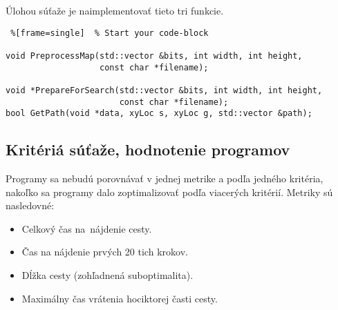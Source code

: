 Úlohou súťaže je naimplementovať tieto tri funkcie.

\lstset{language=C++}          %

\begin{lstlisting} %[frame=single]  % Start your code-block

void PreprocessMap(std::vector &bits, int width, int height,
                   const char *filename);
                   
void *PrepareForSearch(std::vector &bits, int width, int height,
                       const char *filename);
bool GetPath(void *data, xyLoc s, xyLoc g, std::vector &path);
\end{lstlisting}

\subsection{Kritériá súťaže, hodnotenie programov}
Programy sa nebudú porovnávať v jednej metrike a podľa jedného
kritéria, nakoľko sa programy dalo zoptimalizovať podľa viacerých kritérií. Metriky sú nasledovné:

\begin{itemize}
\item Celkový čas na~nájdenie cesty.
\item Čas na nájdenie prvých 20 tich krokov.
\item Dĺžka cesty (zohľadnená suboptimalita).
\item Maximálny čas vrátenia hociktorej časti cesty.
\end{itemize}

